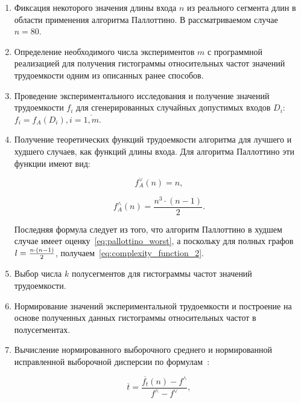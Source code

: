 \documentclass[a4paper, article, 14pt]{extarticle}
\begin{document}
\begin{enumerate}
	\item Фиксация некоторого значения длины входа $n$ из реального сегмента длин в области применения алгоритма Паллоттино. В рассматриваемом случае $n = 80$.
	
	\item Определение необходимого числа экспериментов $m$ с программной реализацией для получения гистограммы относительных частот значений трудоемкости одним из описанных ранее способов.
	
	\item Проведение экспериментального исследования и получение значений трудоемкости $f_i$ для сгенерированных случайных допустимых входов $D_i$: $f_i = f_A(D_i), i = \overline{1, m}$.
	
	\item Получение теоретических функций трудоемкости алгоритма для лучшего и худшего случаев, как функций длины входа. Для алгоритма Паллоттино эти функции имеют вид:
	
	\begin{equation}\label{eq:complexity_function_1}
		f_A^\vee(n) = n,
	\end{equation}
	
	\begin{equation}\label{eq:complexity_function_2}
		f_A^\wedge(n) = \frac{n^3 \cdot (n - 1)}{2}.
	\end{equation}
	
	Последняя формула следует из того, что алгоритм Паллоттино в худшем случае имеет оценку~\eqref{eq:pallottino_worst}, а поскольку для полных графов\\$l = {n \cdot (n - 1) \over{2}}$, получаем~\eqref{eq:complexity_function_2}.
	
	\item Выбор числа $k$ полусегментов для гистограммы частот значений трудоемкости.
	
	\item Нормирование значений экспериментальной трудоемкости и построение на основе полученных данных гистограммы относительных частот в полусегментах.
	
	\item Вычисление нормированного выборочного среднего и нормированной исправленной выборочной дисперсии по формулам~\cite{petrushyn_ulyanov_planning}:
	
	\begin{equation}\label{eq:mean}
		\overline{t} = \frac{\overline{f_t}(n) - f^\wedge}{f^\wedge - f^\vee},
	\end{equation}
	

\end{enumerate}
\end{document}
